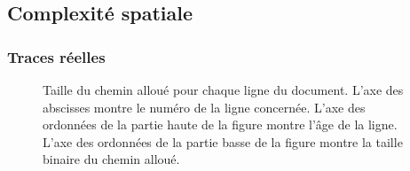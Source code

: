 \subsection{Complexité spatiale}

\subsubsection{Traces réelles}

\begin{figure}
  \centering
  \hspace{10pt}
  \caption[Taille du chemin alloué pour chaque ligne dans Wikipédia]
  {\label{repl:img:motivations} Taille du chemin alloué pour chaque ligne du
    document. L'axe des abscisses montre le numéro de la ligne concernée. L'axe
    des ordonnées de la partie haute de la figure montre l'âge de la
    ligne. L'axe des ordonnées de la partie basse de la figure montre la taille
    binaire du chemin alloué.}
\end{figure}

